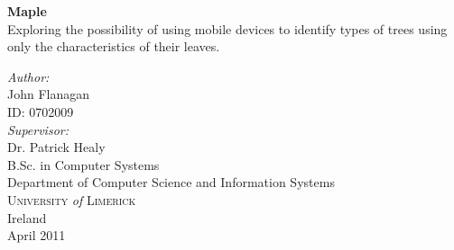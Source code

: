 \begin{titlepage}
 
\begin{center}
 
 
 
 
 
 
{ \Huge \bfseries{Maple}}\\[1.0cm]
   Exploring the possibility of using mobile devices to identify types of trees using only the characteristics of their leaves.\\[1cm]
 

\vfill

\emph{Author:}\\
John Flanagan\\
ID: 0702009\\[1.0cm]
\emph{Supervisor:}\\
Dr. Patrick Healy\\[2.0cm]

 

 
B.Sc. in Computer Systems\\
Department of Computer Science and Information Systems\\
\textsc{University} \textit{of} \textsc{Limerick}\\
Ireland\\[1.0cm]
April 2011
 
\end{center}
 
\end{titlepage}
